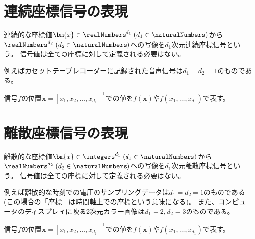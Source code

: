 	\chapter{連続座標信号の表現}
		連続的な座標値$\bm{x}\in\realNumbers^{d_1}\;(d_1\in\naturalNumbers)$から$\realNumbers^{d_2}\;(d_2\in\naturalNumbers)$への写像を$d_1$次元連続座標信号という。
		信号値は全ての座標に対して定義される必要はない。
		\par
		例えばカセットテープレコーダーに記録された音声信号は$d_1=d_2=1$のものである。
		\par
		信号$f$の位置$\bm{x} = [x_1,x_2,\dots,x_{d_1}]^\top$での値を$f(\bm{x})$や$f(x_1,\dots,x_{d_1})$で表す。
	\chapter{離散座標信号の表現}
		離散的な座標値$\bm{x}\in\integers^{d_1}\;(d_1\in\naturalNumbers)$から$\realNumbers^{d_2}\;(d_2\in\naturalNumbers)$への写像を$d_1$次元離散座標信号という。
		信号値は全ての座標に対して定義される必要はない。
		\par
		例えば離散的な時刻での電圧のサンプリングデータは$d_1=d_2=1$のものである(この場合の「座標」は時間軸上での座標という意味になる)。
		また、コンピュータのディスプレイに映る2次元カラー画像は$d_1=2,d_2=3$のものである。
		\par
		信号$f$の位置$\bm{x} = [x_1,x_2,\dots,x_{d_1}]^\top$での値を$f(\bm{x})$や$f(x_1,\dots,x_{d_1})$で表す。
